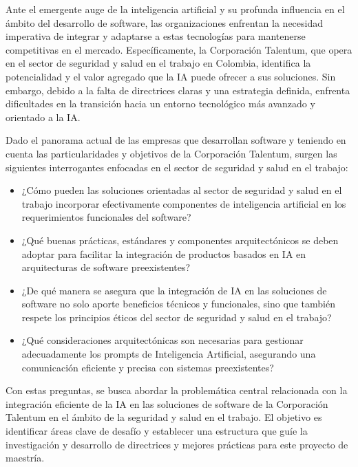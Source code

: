 Ante el emergente auge de la inteligencia artificial y su profunda influencia en el ámbito del desarrollo de software, las organizaciones enfrentan la necesidad imperativa de integrar y adaptarse a estas tecnologías para mantenerse competitivas en el mercado. Específicamente, la Corporación Talentum, que opera en el sector de seguridad y salud en el trabajo en Colombia, identifica la potencialidad y el valor agregado que la IA puede ofrecer a sus soluciones. Sin embargo, debido a la falta de directrices claras y una estrategia definida, enfrenta dificultades en la transición hacia un entorno tecnológico más avanzado y orientado a la IA.

Dado el panorama actual de las empresas que desarrollan software y teniendo en cuenta las particularidades y objetivos de la Corporación Talentum, surgen las siguientes interrogantes enfocadas en el sector de seguridad y salud en el trabajo:
\begin{itemize}
    \item ¿Cómo pueden las soluciones orientadas al sector de seguridad y salud en el trabajo incorporar efectivamente componentes de inteligencia artificial en los requerimientos funcionales del software?
    \item ¿Qué buenas prácticas, estándares y componentes arquitectónicos se deben adoptar para facilitar la integración de productos basados en IA en arquitecturas de software preexistentes?
    \item ¿De qué manera se asegura que la integración de IA en las soluciones de software no solo aporte beneficios técnicos y funcionales, sino que también respete los principios éticos del sector de seguridad y salud en el trabajo?
    \item ¿Qué consideraciones arquitectónicas son necesarias para gestionar adecuadamente los prompts de Inteligencia Artificial, asegurando una comunicación eficiente y precisa con sistemas preexistentes?
\end{itemize}

Con estas preguntas, se busca abordar la problemática central relacionada con la integración eficiente de la IA en las soluciones de software de la Corporación Talentum en el ámbito de la seguridad y salud en el trabajo. El objetivo es identificar áreas clave de desafío y establecer una estructura que guíe la investigación y desarrollo de directrices y mejores prácticas para este proyecto de maestría.

